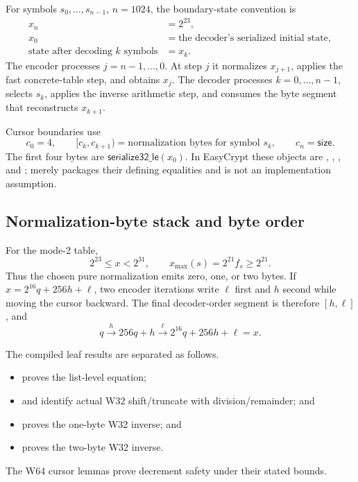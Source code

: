 For symbols $s_0,\ldots,s_{n-1}$, $n=1024$, the boundary-state convention is
\[
\begin{aligned}
  x_n&=2^{23},\\
  x_0&=\text{the decoder's serialized initial state},\\
  \text{state after decoding }k\text{ symbols}&=x_k.
\end{aligned}
\]
The encoder processes $j=n-1,\ldots,0$. At step $j$ it normalizes $x_{j+1}$,
applies the fast concrete-table step, and obtains $x_j$. The decoder processes
$k=0,\ldots,n-1$, selects $s_k$, applies the inverse arithmetic step, and
consumes the byte segment that reconstructs $x_{k+1}$.

Cursor boundaries use
\[
  c_0=4,\qquad
  [c_k,c_{k+1})=\text{normalization bytes for symbol }s_k,\qquad
  c_n=\mathsf{size}.
\]
The first four bytes are $\mathsf{serialize32\_le}(x_0)$. In EasyCrypt these
objects are , , ,
and ;  merely packages their defining
equalities and is not an implementation assumption.

\subsection*{Normalization-byte stack and byte order}

For the mode-2 table,
\[
  2^{23}\leq x<2^{31},\qquad
  x_{\max}(s)=2^{21}f_s\geq2^{21}.
\]
Thus the chosen pure normalization emits zero, one, or two bytes. If
$x=2^{16}q+256h+\ell$, two encoder iterations write $\ell$ first and $h$
second while moving the cursor backward. The final decoder-order segment is
therefore $[h,\ell]$, and
\[
  q\xrightarrow{h}256q+h\xrightarrow{\ell}2^{16}q+256h+\ell=x.
\]

The compiled leaf results are separated as follows.
\begin{itemize}
  \item {} proves the list-level equation;
  \item {} and  identify
    actual W32 shift/truncate with division/remainder; and
  \item {} proves the one-byte W32 inverse;
    and
  \item {} proves the two-byte W32 inverse.
\end{itemize}
The W64 cursor lemmas prove decrement safety under their stated bounds.

